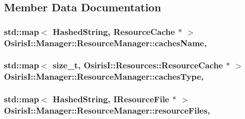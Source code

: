\subsection{Member Data Documentation}
\hypertarget{class_osiris_i_1_1_manager_1_1_resource_manager_ae234f6a64775292c06c0c94025142cdd}{
\subsubsection[{caches\-Name}]{\setlength{\rightskip}{0pt plus 5cm}std\-::map$<$ Hashed\-String, Resource\-Cache $\ast$ $>$ Osiris\-I\-::\-Manager\-::\-Resource\-Manager\-::caches\-Name\hspace{0.3cm}{\ttfamily [static]}, {\ttfamily [protected]}}}\label{class_osiris_i_1_1_manager_1_1_resource_manager_ae234f6a64775292c06c0c94025142cdd}
\hypertarget{class_osiris_i_1_1_manager_1_1_resource_manager_ae23af6211526383de442b9b99abbbfc9}{
\subsubsection[{caches\-Type}]{\setlength{\rightskip}{0pt plus 5cm}std\-::map$<$ size\-\_\-t, {\bf Osiris\-I\-::\-Resources\-::\-Resource\-Cache} $\ast$ $>$ Osiris\-I\-::\-Manager\-::\-Resource\-Manager\-::caches\-Type\hspace{0.3cm}{\ttfamily [static]}, {\ttfamily [protected]}}}\label{class_osiris_i_1_1_manager_1_1_resource_manager_ae23af6211526383de442b9b99abbbfc9}
\hypertarget{class_osiris_i_1_1_manager_1_1_resource_manager_a95179adee0410f0102d5bb042dec82f6}{
\subsubsection[{resource\-Files}]{\setlength{\rightskip}{0pt plus 5cm}std\-::map$<$ Hashed\-String, I\-Resource\-File $\ast$ $>$ Osiris\-I\-::\-Manager\-::\-Resource\-Manager\-::resource\-Files\hspace{0.3cm}{\ttfamily [static]}, {\ttfamily [protected]}}}\label{class_osiris_i_1_1_manager_1_1_resource_manager_a95179adee0410f0102d5bb042dec82f6}


